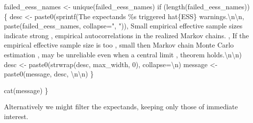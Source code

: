 \documentclass[
  letterpaper,
  DIV=11,
  numbers=noendperiod]{scrartcl}
\newenvironment{Shaded}{\begin{snugshade}}{\end{snugshade}}
\newcommand{\CharTok}[1]{\textcolor[rgb]{0.13,0.47,0.30}{#1}}
\newcommand{\ControlFlowTok}[1]{\textcolor[rgb]{0.00,0.23,0.31}{#1}}
\newcommand{\DecValTok}[1]{\textcolor[rgb]{0.68,0.00,0.00}{#1}}
\newcommand{\NormalTok}[1]{\textcolor[rgb]{0.00,0.23,0.31}{#1}}
\newcommand{\OperatorTok}[1]{\textcolor[rgb]{0.37,0.37,0.37}{#1}}
\newcommand{\SpecialCharTok}[1]{\textcolor[rgb]{0.37,0.37,0.37}{#1}}
\newcommand{\StringTok}[1]{\textcolor[rgb]{0.13,0.47,0.30}{#1}}
\begin{document}
\begin{Shaded}
\begin{Highlighting}[]
\NormalTok{  failed\_eess\_names }\OperatorTok{\textless{}{-}}\NormalTok{ unique(failed\_eess\_names)}
  \ControlFlowTok{if}\NormalTok{ (length(failed\_eess\_names)) \{}
\NormalTok{    desc }\OperatorTok{\textless{}{-}} 
\NormalTok{      paste0(sprintf(}\StringTok{\textquotesingle{}The expectands }\SpecialCharTok{\%s}\StringTok{ triggered hat}\SpecialCharTok{\{ESS\}}\StringTok{ warnings.}\CharTok{\textbackslash{}n\textbackslash{}n}\StringTok{\textquotesingle{}}\NormalTok{,}
\NormalTok{             paste(failed\_eess\_names, collapse}\OperatorTok{=}\StringTok{", "}\NormalTok{)),}
             \StringTok{\textquotesingle{}  Small empirical effective sample sizes indicate strong \textquotesingle{}}\NormalTok{,}
             \StringTok{\textquotesingle{}empirical autocorrelations in the realized Markov chains. \textquotesingle{}}\NormalTok{,}
             \StringTok{\textquotesingle{}If the empirical effective sample size is too \textquotesingle{}}\NormalTok{,}
             \StringTok{\textquotesingle{}small then Markov chain Monte Carlo estimation \textquotesingle{}}\NormalTok{,}
             \StringTok{\textquotesingle{}may be unreliable even when a central limit \textquotesingle{}}\NormalTok{,}
             \StringTok{\textquotesingle{}theorem holds.}\CharTok{\textbackslash{}n\textbackslash{}n}\StringTok{\textquotesingle{}}\NormalTok{)}
\NormalTok{    desc }\OperatorTok{\textless{}{-}}\NormalTok{ paste0(strwrap(desc, max\_width, }\DecValTok{0}\NormalTok{), collapse}\OperatorTok{=}\StringTok{\textquotesingle{}}\CharTok{\textbackslash{}n}\StringTok{\textquotesingle{}}\NormalTok{)}
\NormalTok{    message }\OperatorTok{\textless{}{-}}\NormalTok{ paste0(message, desc, }\StringTok{\textquotesingle{}}\CharTok{\textbackslash{}n\textbackslash{}n}\StringTok{\textquotesingle{}}\NormalTok{)}
\NormalTok{  \}}
  
\NormalTok{  cat(message)}
\NormalTok{\}}
\end{Highlighting}
\end{Shaded}

Alternatively we might filter the expectands, keeping only those of
immediate interest.
\end{document}
